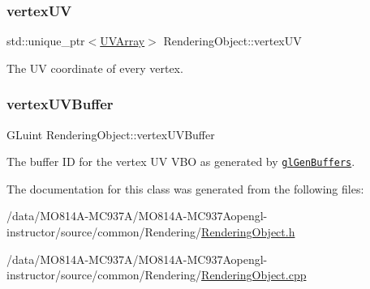 \hypertarget{class_rendering_object_afc405316bddec4ba1d5c228ecc0d9061}{}\label{class_rendering_object_afc405316bddec4ba1d5c228ecc0d9061}
\subsubsection{\texorpdfstring{vertex\+UV}{vertexUV}}
{\footnotesize\ttfamily std\+::unique\+\_\+ptr$<$\hyperlink{class_rendering_object_a504ecd45ebe36dfa5b78c46d64d9904a}{U\+V\+Array}$>$ Rendering\+Object\+::vertex\+UV\hspace{0.3cm}{\ttfamily [protected]}}



The UV coordinate of every vertex.

\hypertarget{class_rendering_object_ad583c70014e3f6ab0c9b62ea3c96ad25}{}\label{class_rendering_object_ad583c70014e3f6ab0c9b62ea3c96ad25}
\subsubsection{\texorpdfstring{vertex\+U\+V\+Buffer}{vertexUVBuffer}}
{\footnotesize\ttfamily G\+Luint Rendering\+Object\+::vertex\+U\+V\+Buffer\hspace{0.3cm}{\ttfamily [protected]}}



The buffer ID for the vertex UV V\+BO as generated by \href{https://www.opengl.org/sdk/docs/man/html/glGenBuffers.xhtml}{\tt gl\+Gen\+Buffers}.



The documentation for this class was generated from the following files\+:\begin{DoxyCompactItemize}
\item
/data/MO814A-MC937A/MO814A-MC937Aopengl-\/instructor/source/common/\+Rendering/\hyperlink{_rendering_object_8h}{Rendering\+Object.\+h}\item
/data/MO814A-MC937A/MO814A-MC937Aopengl-\/instructor/source/common/\+Rendering/\hyperlink{_rendering_object_8cpp}{Rendering\+Object.\+cpp}\end{DoxyCompactItemize}
